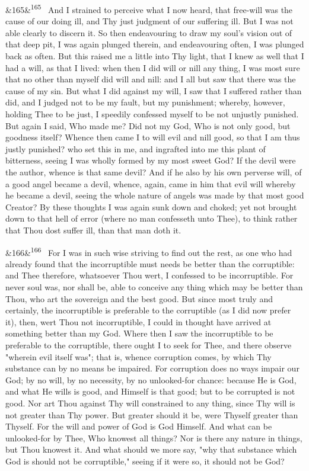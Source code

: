 \documentclass[12pt]{article}
\newcommand{\para}[1][]{\par\noindent\ifx&#1&\else\textsuperscript{\footnotesize #1}~\fi}
\begin{document}
\para[165] And I strained to perceive what I now heard, that free-will was the cause of our doing ill, and Thy just judgment of our suffering ill. But I was not able clearly to discern it. So then endeavouring to draw my soul's vision out of that deep pit, I was again plunged therein, and endeavouring often, I was plunged back as often. But this raised me a little into Thy light, that I knew as well that I had a will, as that I lived: when then I did will or nill any thing, I was most sure that no other than myself did will and nill: and I all but saw that there was the cause of my sin. But what I did against my will, I saw that I suffered rather than did, and I judged not to be my fault, but my punishment; whereby, however, holding Thee to be just, I speedily confessed myself to be not unjustly punished. But again I said, Who made me? Did not my God, Who is not only good, but goodness itself? Whence then came I to will evil and nill good, so that I am thus justly punished? who set this in me, and ingrafted into me this plant of bitterness, seeing I was wholly formed by my most sweet God? If the devil were the author, whence is that same devil? And if he also by his own perverse will, of a good angel became a devil, whence, again, came in him that evil will whereby he became a devil, seeing the whole nature of angels was made by that most good Creator? By these thoughts I was again sunk down and choked; yet not brought down to that hell of error (where no man confesseth unto Thee), to think rather that Thou dost suffer ill, than that man doth it.

\para[166] For I was in such wise striving to find out the rest, as one who had already found that the incorruptible must needs be better than the corruptible: and Thee therefore, whatsoever Thou wert, I confessed to be incorruptible. For never soul was, nor shall be, able to conceive any thing which may be better than Thou, who art the sovereign and the best good. But since most truly and certainly, the incorruptible is preferable to the corruptible (as I did now prefer it), then, wert Thou not incorruptible, I could in thought have arrived at something better than my God. Where then I saw the incorruptible to be preferable to the corruptible, there ought I to seek for Thee, and there observe "wherein evil itself was"; that is, whence corruption comes, by which Thy substance can by no means be impaired. For corruption does no ways impair our God; by no will, by no necessity, by no unlooked-for chance: because He is God, and what He wills is good, and Himself is that good; but to be corrupted is not good. Nor art Thou against Thy will constrained to any thing, since Thy will is not greater than Thy power. But greater should it be, were Thyself greater than Thyself. For the will and power of God is God Himself. And what can be unlooked-for by Thee, Who knowest all things? Nor is there any nature in things, but Thou knowest it. And what should we more say, "why that substance which God is should not be corruptible," seeing if it were so, it should not be God?
\end{document}
